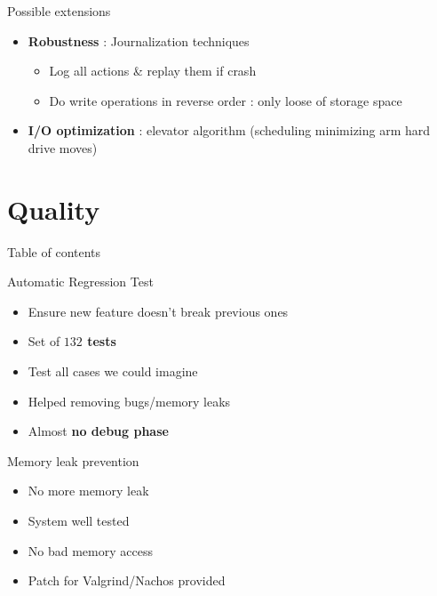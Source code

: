 \documentclass{beamer}
\begin{document}
\begin{frame}{Possible extensions}
    \begin{itemize}
        \item \textbf{Robustness} : Journalization techniques
            \begin{itemize}
                \item Log all actions \& replay them if crash
                \item Do write operations in reverse order : only loose of
                    storage space
            \end{itemize}
        \item \textbf{I/O optimization} : elevator algorithm (scheduling minimizing arm
            hard drive moves)
    \end{itemize}
\end{frame}

\section{Quality}
\begin{frame}{Table of contents}
    \tableofcontents[currentsection]
\end{frame}

\begin{frame}{Automatic Regression Test}
    \begin{itemize}
        \item Ensure new feature doesn't break previous ones
        \item Set of \textbf{$132$ tests}
        \item Test all cases we could imagine
        \item Helped removing bugs/memory leaks
        \item Almost \textbf{no debug phase}
    \end{itemize}
\end{frame}

\begin{frame}{Memory leak prevention}
    \begin{itemize}
        \item No more memory leak
        \item System well tested
        \item No bad memory access
        \item Patch for Valgrind/Nachos provided
    \end{itemize}
\end{frame}
\end{document}
